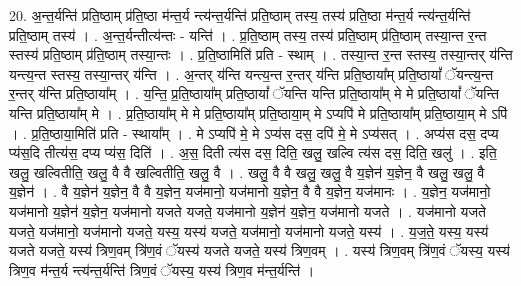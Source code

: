 \documentclass[17pt]{extarticle}
\begin{document}
20. अ॒न्त॒र्यन्ति॑ प्रति॒ष्ठाम् प्र॑ति॒ष्ठा म॑न्त॒र्य न्त्य॑न्त॒र्यन्ति॑ प्रति॒ष्ठाम् तस्य॒ तस्य॑ प्रति॒ष्ठा म॑न्त॒र्य
न्त्य॑न्त॒र्यन्ति॑ प्रति॒ष्ठाम् तस्य॑ । . अ॒न्त॒र्यन्तीत्य॑न्तः - यन्ति॑ । . प्र॒ति॒ष्ठाम् तस्य॒ तस्य॑ प्रति॒ष्ठाम् प्र॑ति॒ष्ठाम् तस्या॒न्त र॒न्त स्तस्य॑ प्रति॒ष्ठाम् प्र॑ति॒ष्ठाम् तस्या॒न्तः । . प्र॒ति॒ष्ठामिति॑ प्रति - स्थाम् । . तस्या॒न्त र॒न्त स्तस्य॒ तस्या॒न्तर् य॑न्ति यन्त्य॒न्त स्तस्य॒ तस्या॒न्तर् य॑न्ति । . अ॒न्तर् य॑न्ति यन्त्य॒न्त र॒न्तर् य॑न्ति प्रति॒ष्ठाया᳚म् प्रति॒ष्ठायां᳚ ॅयन्त्य॒न्त र॒न्तर् य॑न्ति प्रति॒ष्ठाया᳚म् । . य॒न्ति॒ प्र॒ति॒ष्ठाया᳚म् प्रति॒ष्ठायां᳚ ॅयन्ति यन्ति प्रति॒ष्ठाया᳚म् मे मे प्रति॒ष्ठायां᳚ ॅयन्ति यन्ति प्रति॒ष्ठाया᳚म् मे । . प्र॒ति॒ष्ठाया᳚म् मे मे प्रति॒ष्ठाया᳚म् प्रति॒ष्ठाया॒म् मे ऽप्यपि॑ मे प्रति॒ष्ठाया᳚म् प्रति॒ष्ठाया॒म् मे ऽपि॑ । . प्र॒ति॒ष्ठाया॒मिति॑ प्रति - स्थाया᳚म् । . मे ऽप्यपि॑ मे॒ मे ऽप्य॑स दस॒ दपि॑ मे॒ मे ऽप्य॑सत् । . अप्य॑स दस॒ दप्य प्य॑स॒दि तीत्य॑स॒ दप्य प्य॑स॒ दिति॑ । . अ॒स॒ दिती त्य॑स दस॒ दिति॒ खलु॒ खल्वि त्य॑स दस॒ दिति॒ खलु॑ । . इति॒ खलु॒ खल्वितीति॒ खलु॒ वै वै खल्वितीति॒ खलु॒ वै । . खलु॒ वै वै खलु॒ खलु॒ वै य॒ज्ञेन॑ य॒ज्ञेन॒ वै खलु॒ खलु॒ वै य॒ज्ञेन॑ । . वै य॒ज्ञेन॑ य॒ज्ञेन॒ वै वै य॒ज्ञेन॒ यज॑मानो॒ यज॑मानो य॒ज्ञेन॒ वै वै य॒ज्ञेन॒ यज॑मानः । . य॒ज्ञेन॒ यज॑मानो॒ यज॑मानो य॒ज्ञेन॑ य॒ज्ञेन॒ यज॑मानो यजते यजते॒ यज॑मानो य॒ज्ञेन॑ य॒ज्ञेन॒ यज॑मानो यजते । . यज॑मानो यजते यजते॒ यज॑मानो॒ यज॑मानो यजते॒ यस्य॒ यस्य॑ यजते॒ यज॑मानो॒ यज॑मानो यजते॒ यस्य॑ । . य॒ज॒ते॒ यस्य॒ यस्य॑ यजते यजते॒ यस्य॑ त्रिण॒वम् त्रि॑ण॒वं ॅयस्य॑ यजते यजते॒ यस्य॑ त्रिण॒वम् । . यस्य॑ त्रिण॒वम् त्रि॑ण॒वं ॅयस्य॒ यस्य॑ त्रिण॒व म॑न्त॒र्य न्त्य॑न्त॒र्यन्ति॑ त्रिण॒वं ॅयस्य॒ यस्य॑ त्रिण॒व म॑न्त॒र्यन्ति॑ । \newline
\end{document}
